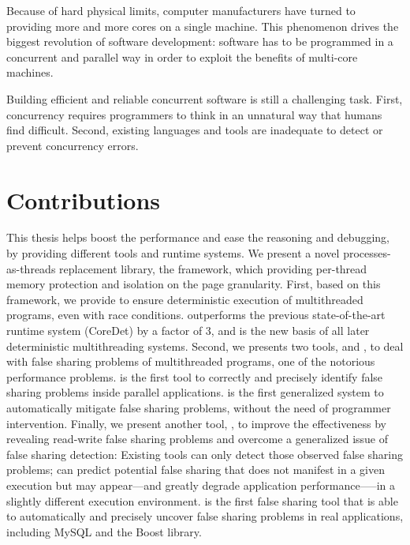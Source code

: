 \label{chapter:conclusion}

Because of hard physical limits, computer manufacturers have turned to providing more and more cores on a single machine. This phenomenon drives the biggest revolution of software development: software has to be programmed in a concurrent and parallel way in order to exploit the benefits of multi-core machines.

Building efficient and reliable concurrent software is still a challenging task. First, concurrency requires programmers to think in an unnatural way that humans find difficult.  Second, existing languages and tools are inadequate to detect or prevent concurrency errors.  

\section{Contributions}

This thesis helps boost the performance and ease the reasoning and debugging, by providing different tools and runtime systems. We present a novel processes-as-threads replacement library, the \sheriff{} framework, which providing per-thread memory protection and isolation on the page granularity. First, based on this framework, we provide \dthreads{} to ensure deterministic execution of multithreaded programs, even with race conditions. \dthreads{} outperforms the previous state-of-the-art runtime system (CoreDet) by a factor of 3, and is the new basis of all later deterministic multithreading systems. Second, we presents two tools, \SheriffDetect{} and \SheriffProtect{}, to deal with false sharing problems of multithreaded programs, one of the notorious performance problems. \SheriffDetect{} is the first tool to correctly and precisely identify false sharing problems inside parallel applications. \SheriffProtect{} is the first generalized system to automatically mitigate false sharing problems, without the need of programmer intervention.  Finally, we present another tool, \predator{}, to improve the effectiveness by revealing read-write false sharing problems and overcome a generalized issue of false sharing detection: Existing tools can only detect those observed false sharing problems; \Predator{} can predict potential false sharing that does not manifest in a given execution but may appear---and greatly degrade application performance—--in a slightly different execution environment. \Predator{} is the first false sharing tool that is able to automatically and precisely uncover false sharing problems in real applications, including MySQL and the Boost library.

